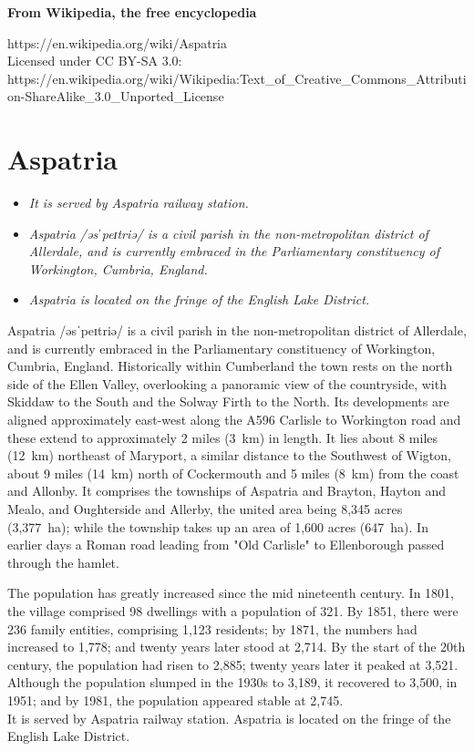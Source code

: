 \textbf{From Wikipedia, the free encyclopedia}

https://en.wikipedia.org/wiki/Aspatria\\
Licensed under CC BY-SA 3.0:\\
https://en.wikipedia.org/wiki/Wikipedia:Text\_of\_Creative\_Commons\_Attribution-ShareAlike\_3.0\_Unported\_License

\section{Aspatria}\label{aspatria}

\begin{itemize}
\item
  \emph{It is served by Aspatria railway station.}
\item
  \emph{Aspatria /əsˈpeɪtriə/ is a civil parish in the non-metropolitan
  district of Allerdale, and is currently embraced in the Parliamentary
  constituency of Workington, Cumbria, England.}
\item
  \emph{Aspatria is located on the fringe of the English Lake District.}
\end{itemize}

Aspatria /əsˈpeɪtriə/ is a civil parish in the non-metropolitan district
of Allerdale, and is currently embraced in the Parliamentary
constituency of Workington, Cumbria, England. Historically within
Cumberland the town rests on the north side of the Ellen Valley,
overlooking a panoramic view of the countryside, with Skiddaw to the
South and the Solway Firth to the North. Its developments are aligned
approximately east-west along the A596 Carlisle to Workington road and
these extend to approximately 2 miles (3~km) in length. It lies about 8
miles (12~km) northeast of Maryport, a similar distance to the Southwest
of Wigton, about 9 miles (14~km) north of Cockermouth and 5 miles (8~km)
from the coast and Allonby. It comprises the townships of Aspatria and
Brayton, Hayton and Mealo, and Oughterside and Allerby, the united area
being 8,345 acres (3,377~ha); while the township takes up an area of
1,600 acres (647~ha). In earlier days a Roman road leading from "Old
Carlisle" to Ellenborough passed through the hamlet.

The population has greatly increased since the mid nineteenth century.
In 1801, the village comprised 98 dwellings with a population of 321. By
1851, there were 236 family entities, comprising 1,123 residents; by
1871, the numbers had increased to 1,778; and twenty years later stood
at 2,714. By the start of the 20th century, the population had risen to
2,885; twenty years later it peaked at 3,521. Although the population
slumped in the 1930s to 3,189, it recovered to 3,500, in 1951; and by
1981, the population appeared stable at 2,745.\\
It is served by Aspatria railway station. Aspatria is located on the
fringe of the English Lake District.

